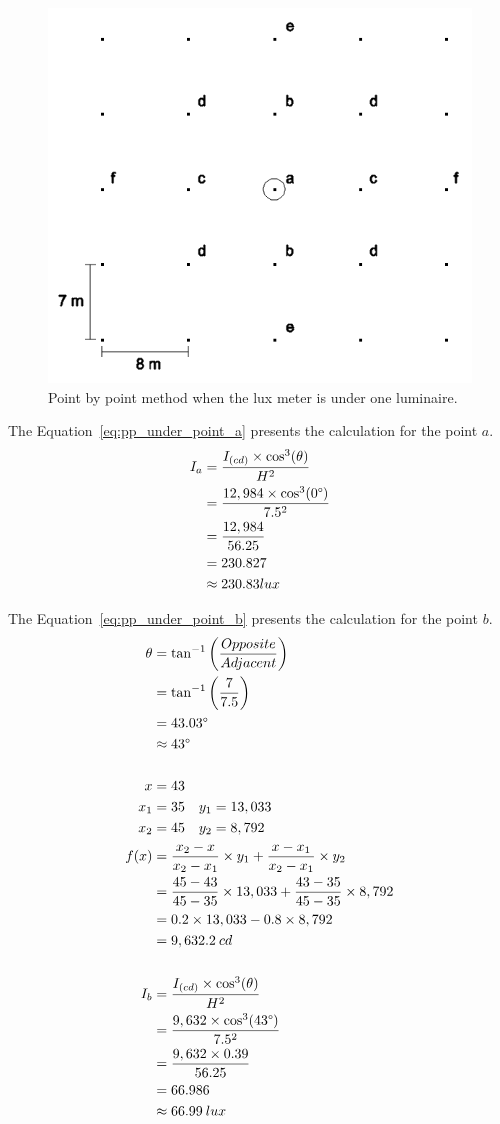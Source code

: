 \begin{figure}[h!]
\centering
\includegraphics[width=.5\textwidth]{./figs/pp_under_lum.png}
\caption{Point by point method when the lux meter is under one luminaire.}
\label{fig:pp_under_lum}
\end{figure}

The Equation~\ref{eq:pp_under_point_a} presents the calculation for the point $a$.
\begin{equation}
\begin{split}
I_a &= \frac{I_{(cd)} \times \cos^3(\theta)}{H^2} \\
 &= \frac{12,984 \times \cos^3(0\degree)}{7.5^2} \\
 &= \frac{12,984}{56.25} \\
 & = 230.827 \\
 & \approx 230.83 lux
\end{split}
\label{eq:pp_under_point_a}
\end{equation}

The Equation~\ref{eq:pp_under_point_b} presents the calculation for the point $b$.
\begin{equation}
\begin{split}
\theta &= \tan^{-1}\left( \frac{Opposite}{Adjacent} \right) \\
 & = \tan^{-1}\left( \frac{7}{7.5} \right) \\
 & = 43.03\degree \\
 & \approx 43\degree\\
\\
x & = 43 \\
x_1 & = 35 \quad y_1 = 13,033 \\
x_2 & = 45 \quad y_2 = 8,792 \\
f(x) &= \frac{x_2 - x}{x_2 - x_1} \times y_1 +
       \frac{x - x_1}{x_2 - x_1} \times y_2 \\
 &= \frac{45 - 43}{45 - 35} \times 13,033 +
    \frac{43 - 35}{45 - 35} \times 8,792 \\
 & = 0.2 \times 13,033 - 0.8 \times 8,792 \\
 & = 9,632.2\: cd \\
\\
I_b &= \frac{I_{(cd)} \times \cos^3(\theta)}{H^2} \\
 &= \frac{9,632 \times \cos^3(43\degree)}{7.5^2} \\
 &= \frac{9,632 \times 0.39}{56.25} \\
 & = 66.986 \\
 & \approx 66.99\: lux
\end{split}
\label{eq:pp_under_point_b}
\end{equation}


